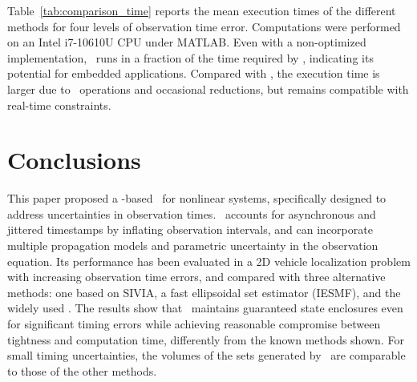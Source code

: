 \documentclass{ifacconf}
\begin{document}
Table~\ref{tab:comparison_time} reports the mean execution times of the different methods for four levels of observation time error. Computations were performed on an Intel i7-10610U CPU under MATLAB. Even with a non-optimized implementation, \czesmf\ runs in a fraction of the time required by \vsivia, indicating its potential for embedded applications. Compared with \iesmf, the execution time is larger due to \cz\ operations and occasional reductions, but remains compatible with real-time constraints.%


\section{Conclusions}\label{sec:conclusion}
\vspace{-0.2cm}
This paper proposed a \cz-based \smf\ for nonlinear systems, specifically designed to address uncertainties in observation times. 
\czesmf\ accounts for asynchronous and jittered timestamps by inflating observation intervals, and can incorporate multiple propagation models and parametric uncertainty in the observation equation. Its performance has been evaluated in a 2D vehicle localization problem with increasing observation time errors, and compared with three alternative methods: one based on SIVIA, a fast ellipsoidal set estimator (IESMF), and the widely used \ekf.
The results show that \czesmf\ maintains guaranteed state enclosures even for significant timing errors while achieving reasonable compromise between tightness and computation time, differently from the known methods shown. For small timing uncertainties, the volumes of the sets generated by \czesmf\ are comparable to those of the other methods.
\end{document}
